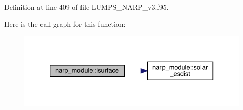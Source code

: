 Definition at line 409 of file L\+U\+M\+P\+S\+\_\+\+N\+A\+R\+P\+\_\+v3.\+f95.

Here is the call graph for this function\+:\nopagebreak
\begin{figure}[H]
\begin{center}
\leavevmode
\includegraphics[width=333pt]{namespacenarp__module_a67c38c5ffd466f983c36961a978ca980_cgraph}
\end{center}
\end{figure}
\mbox{\label{namespacenarp__module_ac480c3115a6413b9e79770f601e68895}} 
